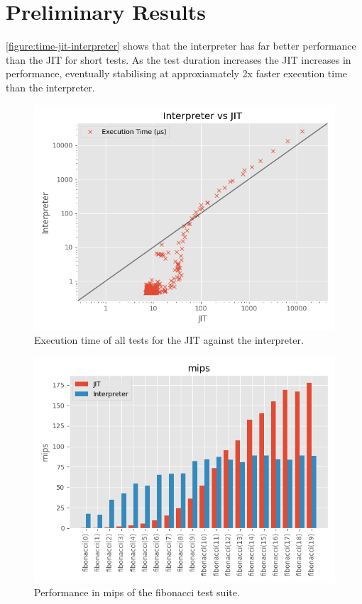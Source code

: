 \section{Preliminary Results}

\autoref{figure:time-jit-interpreter} shows that the interpreter has far better performance than the JIT for short tests. As the test duration increases the JIT increases in performance, eventually stabilising at approxiamately 2x faster execution time than the interpreter.

\begin{figure}
    \centering
    \includegraphics{output/graphs/scatter/time.png}
    \caption{Execution time of all tests for the JIT against the interpreter.}
    \label{figure:time-jit-interpreter}
\end{figure}

\begin{figure}
    \centering
    \includegraphics{output/graphs/tests/fibonacci/mips.png}
    \caption{Performance in mips of the fibonacci test suite.}
    \label{figure:fibonacci-mips}
\end{figure}

